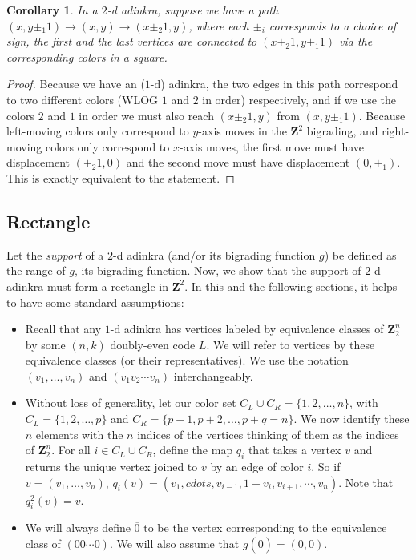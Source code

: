 \documentclass[12pt,twoside,singlespace]{article}
\numberwithin{equation}{section}
\newtheorem{cor}[equation]{Corollary}
\theoremstyle{definition}
\newcommand{\ZZ}{\mathbf{Z}}
\begin{document}
\begin{cor}
\label{cor:square}
In a $2$-d adinkra, suppose we have a path $(x, y \pm_1 1) \rightarrow (x, y) \rightarrow (x \pm_2 1, y)$, where each $\pm_i$ corresponds to a choice of sign, the first and the last vertices are connected to $(x \pm_2 1, y \pm_1 1)$ via the corresponding colors in a square.
\end{cor}
\begin{proof}
Because we have an ($1$-d) adinkra, the two edges in this path correspond to two different colors (WLOG $1$ and $2$ in order) respectively, and if we use the colors $2$ and $1$ in order we must also reach $(x \pm_2 1, y)$ from $(x, y \pm_1 1)$. Because left-moving colors only correspond to $y$-axis moves in the $\ZZ^2$ bigrading, and right-moving colors only correspond to $x$-axis moves, the first move must have displacement $(\pm_2 1, 0)$ and the second move must have displacement $(0, \pm_1)$. This is exactly equivalent to the statement.
\end{proof}

\subsection{Rectangle}

Let the \emph{support} of a $2$-d adinkra (and/or its bigrading function $g$) be defined as the range of $g$, its bigrading function. Now, we show that the support of $2$-d adinkra must form a rectangle in $\ZZ^2$. In this and the following sections, it helps to have some standard assumptions:

\begin{itemize}
\item Recall that any $1$-d adinkra has vertices labeled by equivalence classes of $\ZZ_2^n$ by some $(n,k)$ doubly-even code $L$. We will refer to vertices by these equivalence classes (or their representatives). We use the notation $(v_1, \ldots, v_n)$ and $(v_1 v_2 \cdots v_n)$ interchangeably.
\item Without loss of generality, let our color set $C_L \cup C_R = \{1,2,\ldots, n\}$, with $C_L = \{1, 2, \ldots, p\}$ and $C_R = \{p+1, p+2, \ldots, p+q=n\}$. We now identify these $n$ elements with the $n$ indices of the vertices thinking of them as the indices of $\ZZ_2^n$. For all $i \in C_L \cup C_R$, define the map $q_i$ that takes a vertex $v$ and returns the unique vertex joined to $v$ by an edge of color $i$. So if $v = (v_1, \ldots, v_n)$, $q_i(v) = (v_1, cdots, v_{i-1}, 1-v_i, v_{i+1}, \cdots, v_n)$. Note that $q_i^2(v) = v$.
\item We will always define $\overline{0}$ to be the vertex corresponding to the equivalence class of $(00\cdots0)$. We will also assume that $g(\overline{0}) = (0,0)$. 
\end{itemize}
\end{document}
